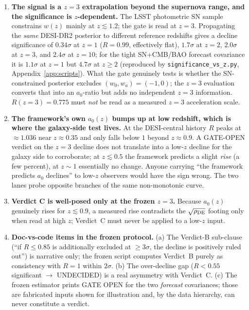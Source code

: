 \documentclass[11pt,a4paper]{article}
\newcommand{\rhoDE}{\rho_{\rm DE}}
\newcommand{\azero}{a_0}
\begin{document}
\begin{enumerate}
\item \textbf{The signal is a $z=3$ extrapolation beyond the supernova range,
and the significance is $z$-dependent.} The LSST photometric SN sample
constrains $w(z)$ mainly at $z\lesssim1.2$; the gate is read at $z=3$.
Propagating the \emph{same} DESI-DR2 posterior to different reference
redshifts gives a decline significance of $0.34\sigma$ at $z=1$ ($R=0.99$,
effectively flat), $1.7\sigma$ at $z=2$, $2.0\sigma$ at $z=3$, and $2.4\sigma$
at $z=10$; for the tight SN+CMB/BAO forecast covariance it is $1.1\sigma$ at
$z=1$ but $4.7\sigma$ at $z\ge2$ (reproduced by
\texttt{significance\_vs\_z.py}, Appendix~\ref{app:scripts}). What the gate
genuinely tests is whether the SN-constrained posterior excludes
$(w_0,w_a)=(-1,0)$; the $z=3$ evaluation converts that into an $\azero$-ratio
but adds no independent $z=3$ information. $R(z{=}3)=0.775$ must \emph{not} be
read as a measured $z=3$ acceleration scale.
\item \textbf{The framework's own $\azero(z)$ bumps up at low redshift, which
is where the galaxy-side test lives.} At the DESI-central history $R$ peaks at
$\approx1.036$ near $z\approx0.35$ and only falls below $1$ beyond
$z\approx0.9$. A GATE-OPEN verdict on the $z=3$ decline does not translate
into a low-$z$ decline for the galaxy side to corroborate; at $z\lesssim0.5$
the framework predicts a slight \emph{rise} (a few percent), at $z\sim1$
essentially no change. Anyone carrying ``the framework predicts $\azero$
declines'' to low-$z$ observers would have the sign wrong. The two lanes probe
opposite branches of the same non-monotonic curve.
\item \textbf{Verdict C is well-posed only at the frozen $z=3$.} Because
$\azero(z)$ genuinely rises for $z\lesssim0.9$, a measured rise contradicts
the $\sqrt{\rhoDE}$ footing only when read at high $z$; Verdict~C must never
be applied to a low-$z$ input.
\item \textbf{Doc-vs-code items in the frozen protocol.} (a) The Verdict-B
sub-clause (``if $R\le0.85$ is additionally excluded at $\ge3\sigma$, the
decline is positively ruled out'') is narrative only; the frozen script
computes Verdict~B purely as consistency with $R=1$ within $2\sigma$. (b) The
over-decline gap ($R<0.55$ significant $\to$ UNDECIDED) is a real asymmetry
with Verdict~C. (c) The frozen estimator prints GATE OPEN for the two
\emph{forecast} covariances; those are fabricated inputs shown for
illustration and, by the data hierarchy, can never constitute a verdict.

\end{enumerate}
\end{document}
